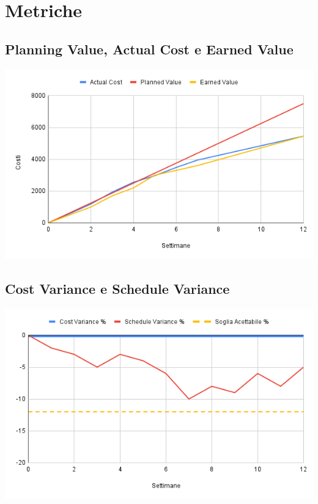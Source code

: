 \documentclass[a4paper, 12pt]{article}
\begin{document}
\section{Metriche}
\subsection*{Planning Value, Actual Cost e Earned Value}
\begin{center}
	\includegraphics[scale=0.5]{AC_PV_EV.png}
\end{center}


\subsection*{Cost Variance e Schedule Variance}
\begin{center}
	\includegraphics[scale=0.5]{Cost_Variance_Schedule_Variance.png}
\end{center}
\end{document}
